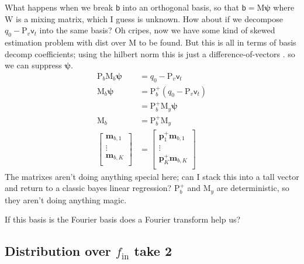 \documentclass{article}
\newcommand{\vv}[1]{\boldsymbol{#1}}
\newcommand{\mm}[1]{\mathrm{#1}}
\newcommand{\rv}[1]{\mathsf{#1}}
\newcommand{\lat}{\rv{b}}   %
\newcommand{\latst}{b}      %
\begin{document}
What happens when we break \(\lat\) into an orthogonal basis, so that \(\lat=\mm{M}\vv{\psi}\) where \(\mm{W}\) is a mixing matrix, which I guess is unknown.
How about if we decompose \(q_0 - \mm{P}_{v}\rv{v}_{t}\) into the same basis?
Oh cripes, now we have some kind of skewed estimation problem with dist over \(\mm{M}\) to be found.
But this is all in terms of basis decomp coefficients; using the hilbert norm this is just a difference-of-vectors .
so we can suppress \(\vv{\psi}\).
\begin{align}
    \mm{P}_{\latst}\mm{M}_{\latst}\vv{\psi}&= q_0 - \mm{P}_{v}\rv{v}_{t}\\
    \mm{M}_{\latst}\vv{\psi}&=\mm{P}_{\latst}^{+}(q_0 - \mm{P}_{v}\rv{v}_{t})\\
    &=\mm{P}_{\latst}^{+}\mm{M}_{y}\vv{\psi}\\
    \mm{M}_{\latst}&=\mm{P}_{\latst}^{+}\mm{M}_{y}\\
    \begin{bmatrix}
        \vv{m}_{\latst,1}\\
        \vdots\\
        \vv{m}_{\latst,K}\\
    \end{bmatrix}&=\begin{bmatrix}
        \vv{p}^{+}_1\vv{m}_{\latst,1}\\
        \vdots\\
        \vv{p}^{+}_K\vv{m}_{\latst,K}\\
    \end{bmatrix}
\end{align}
The matrixes aren't doing anything special here; can I stack this into a tall vector and return to a classic bayes linear regression? \(\mm{P}_{\latst}^{+}\) and \(\mm{M}_{y}\) are deterministic, so they aren't doing anything magic.


If this basis is the Fourier basis does a Fourier transform help us?

\subsection{Distribution over $f_{\text{in}}$ take 2}
\end{document}
